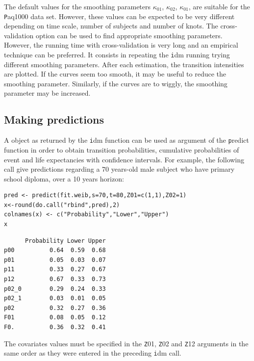 \documentclass{article}
\newcommand{\code}[1]{{\texttt #1}}
\begin{document}
The default values for the smoothing parameters $\kappa_{01}$, $\kappa_{02}$, 
$\kappa_{01}$, are suitable for the
\code{Paq1000} data set. However, these values can be expected to be
very different depending on time scale, number of subjects and number of knots. 
The cross-validation option can be used to find appropriate smoothing parameters.
However, the running time with cross-validation is very long and an empirical
technique can be preferred. It consists in repeating the \code{idm} running
trying different smoothing parameters.  After each estimation, the
transition intensities are plotted. 
If the curves seem too smooth, it may be useful
to reduce the smoothing parameter. Similarly, if the curves
are to wiggly, the smoothing parameter may be increased.
\subsection{Making predictions}
\label{sec-5-4}
A object as returned by the \code{idm} function 
can be used as argument of the \code{predict} function in
order to obtain transition probabilities, cumulative probabilities of event and 
life expectancies with confidence intervals. 
For example, the following call give predictions regarding 
a 70 years-old male subject who have primary school diploma, 
over a 10 years horizon: 

\lstset{basicstyle=\small\tt,numbers=left,language=R}
\begin{lstlisting}
pred <- predict(fit.weib,s=70,t=80,Z01=c(1,1),Z02=1)
x<-round(do.call("rbind",pred),2)
colnames(x) <- c("Probability","Lower","Upper")
x
\end{lstlisting}

\begin{verbatim}
      Probability Lower Upper
p00          0.64  0.59  0.68
p01          0.05  0.03  0.07
p11          0.33  0.27  0.67
p12          0.67  0.33  0.73
p02_0        0.29  0.24  0.33
p02_1        0.03  0.01  0.05
p02          0.32  0.27  0.36
F01          0.08  0.05  0.12
F0.          0.36  0.32  0.41
\end{verbatim}

The covariates values must be specified in the \code{Z01}, \code{Z02} and \code{Z12} 
arguments in the same order as they were entered in the preceding \code{idm} call.
\end{document}
